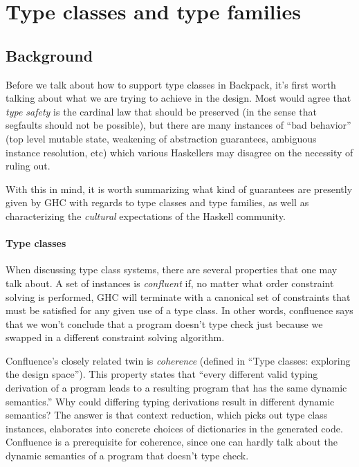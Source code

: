 \documentclass{article}
\begin{document}
\section{Type classes and type families}

\subsection{Background}

Before we talk about how to support type classes in Backpack, it's first
worth talking about what we are trying to achieve in the design.  Most
would agree that \emph{type safety} is the cardinal law that should be
preserved (in the sense that segfaults should not be possible), but
there are many instances of ``bad behavior'' (top level mutable state,
weakening of abstraction guarantees, ambiguous instance resolution, etc)
which various Haskellers may disagree on the necessity of ruling out.

With this in mind, it is worth summarizing what kind of guarantees are
presently given by GHC with regards to type classes and type families,
as well as characterizing the \emph{cultural} expectations of the
Haskell community.

\paragraph{Type classes}  When discussing type class systems, there are
several properties that one may talk about.
A set of instances is \emph{confluent} if, no matter what order
constraint solving is performed, GHC will terminate with a canonical set
of constraints that must be satisfied for any given use of a type class.
In other words, confluence says that we won't conclude that a program
doesn't type check just because we swapped in a different constraint
solving algorithm.

Confluence's closely related twin is \emph{coherence} (defined in ``Type
classes: exploring the design space''). This property states that
``every different valid typing derivation of a program leads to a
resulting program that has the same dynamic semantics.''  Why could
differing typing derivations result in different dynamic semantics?  The
answer is that context reduction, which picks out type class instances,
elaborates into concrete choices of dictionaries in the generated code.
Confluence is a prerequisite for coherence, since one
can hardly talk about the dynamic semantics of a program that doesn't
type check.
\end{document}

